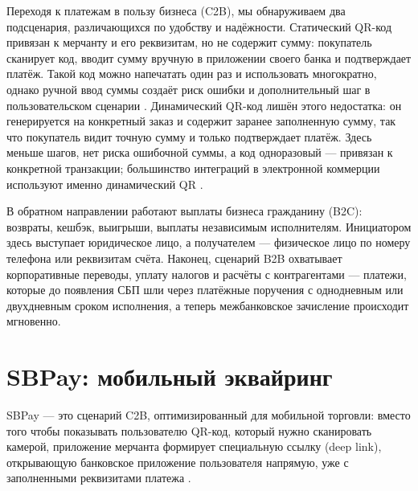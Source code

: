 Переходя к платежам в пользу бизнеса (C2B), мы обнаруживаем два
подсценария, различающихся по удобству и надёжности. Статический QR-код
привязан к мерчанту и его реквизитам, но не содержит сумму: покупатель
сканирует код, вводит сумму вручную в приложении своего банка
и подтверждает платёж. Такой код можно напечатать один раз и использовать
многократно, однако ручной ввод суммы создаёт риск ошибки
и дополнительный шаг в пользовательском
сценарии .
Динамический QR-код лишён этого недостатка: он генерируется на конкретный
заказ и содержит заранее заполненную сумму, так что покупатель видит
точную сумму и только подтверждает платёж. Здесь меньше шагов, нет риска
ошибочной суммы, а код одноразовый — привязан к конкретной транзакции;
большинство интеграций в электронной коммерции используют именно
динамический QR .

В обратном направлении работают выплаты бизнеса гражданину (B2C):
возвраты, кешбэк, выигрыши, выплаты независимым исполнителям.
Инициатором здесь выступает юридическое лицо, а получателем — физическое
лицо по номеру телефона или реквизитам счёта. Наконец, сценарий B2B
охватывает корпоративные переводы, уплату налогов и расчёты
с контрагентами — платежи, которые до появления СБП шли через платёжные
поручения с однодневным или двухдневным сроком исполнения, а теперь
межбанковское зачисление происходит мгновенно.


\section{SBPay: мобильный эквайринг}
\label{sec:sbp-sbpay}

SBPay — это сценарий C2B, оптимизированный для мобильной торговли: вместо того чтобы показывать пользователю QR-код,
который нужно сканировать камерой, приложение мерчанта формирует специальную ссылку (deep link), открывающую банковское
приложение пользователя напрямую, уже с заполненными реквизитами платежа .


